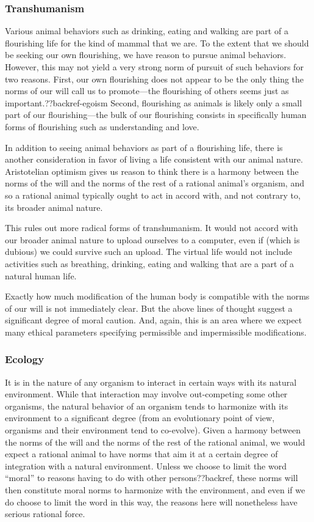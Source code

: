 \subsubsection{Transhumanism}
Various animal behaviors such as drinking, eating and walking are part of a flourishing life for the kind of mammal 
that we are. To the extent that we should be seeking our own flourishing, we have reason to pursue animal behaviors. However,
this may not yield a very strong norm of pursuit of such behaviors for two reasons. First, our own flourishing does not appear
to be the only thing the norms of our will call us to promote---the flourishing of others seems just as important.??backref-egoism
Second, flourishing as animals is likely only a small part of our flourishing---the bulk of our flourishing consists in specifically
human forms of flourishing such as understanding and love. 

In addition to seeing animal behaviors as part of a flourishing life, there is another consideration in favor of 
living a life consistent with our animal nature. Aristotelian optimism gives us reason to think there is a harmony between 
the norms of the will and the norms of the rest of a rational animal's organism, and so a rational animal typically ought to act in 
accord with, and not contrary to, its broader animal nature. 

This rules out more radical forms of transhumanism. It would not accord with our broader animal nature to upload ourselves to a computer,
even if (which is dubious) we could survive such an upload. The virtual life would not include 
activities such as breathing, drinking, eating and walking that are a part of a natural human life.

Exactly how much modification of the human body is compatible with the norms of our will is not immediately clear. But the above
lines of thought suggest a significant degree of moral caution. And, again, this is an area where we expect many ethical parameters specifying
permissible and impermissible modifications.

\subsubsection{Ecology}
It is in the nature of any organism to interact in certain ways with its natural environment. While that interaction may 
involve out-competing some other organisms, the natural behavior of an organism tends to 
harmonize with its environment to a significant degree (from an evolutionary point of view, organisms and their environment tend 
to co-evolve). Given a harmony between the norms of the will and the norms of the rest of the rational animal, we would expect 
a rational animal to have norms that aim it at a certain degree of integration with a natural environment. 
Unless we choose to limit the word ``moral'' to reasons having to do with other persons??backref, these norms will then
constitute moral norms to harmonize with the environment, and even if we do choose to limit the word in this way,
the reasons here will nonetheless have serious rational force.

